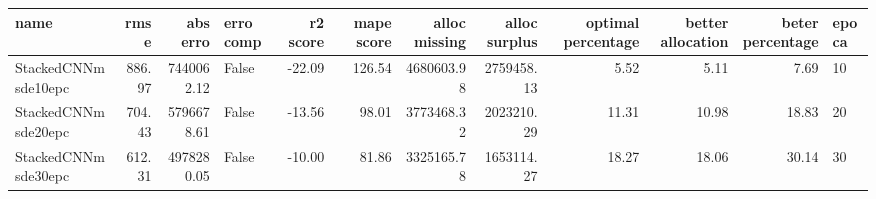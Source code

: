 \begin{tabular}{lrrlrrrrrrrl}
\toprule
name & rmse & abs erro & erro comp & r2 score & mape score & alloc missing & alloc surplus & optimal percentage & better allocation & beter percentage & epoca \\
\midrule
StackedCNNmsde10epc & 886.97 & 7440062.12 & False & -22.09 & 126.54 & 4680603.98 & 2759458.13 & 5.52 & 5.11 & 7.69 & 10 \\
StackedCNNmsde20epc & 704.43 & 5796678.61 & False & -13.56 & 98.01 & 3773468.32 & 2023210.29 & 11.31 & 10.98 & 18.83 & 20 \\
StackedCNNmsde30epc & 612.31 & 4978280.05 & False & -10.00 & 81.86 & 3325165.78 & 1653114.27 & 18.27 & 18.06 & 30.14 & 30 \\
\bottomrule
\end{tabular}
